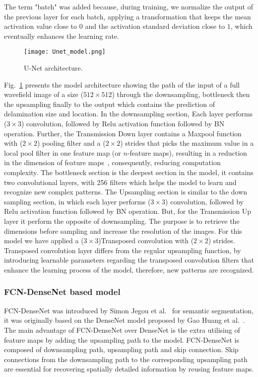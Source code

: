 \documentclass[preprint,9pt]{elsarticle}
\begin{document}
The term "batch" was added because, during training, we normalize the output of the previous layer for each batch, applying a transformation that keeps the mean activation value close to \(0\) and the activation standard deviation close to \(1\), which eventually enhances the learning rate.
\begin{figure} [h!]
	\begin{center}
		\texttt{[image: Unet\_model.png]}
	\end{center}
	\caption{U-Net architecture.} 
	\label{fig:Unet}
\end{figure}
Fig.~\ref{fig:Unet} presents the model architecture showing the path of the input of a full wavefield image of a size (\(512\times512\)) through the downsampling, bottleneck then the upsampling finally to the output which contains the prediction of delamination size and location. 
In the downsampling section,
Each layer performs (\(3\times3\)) convolution, followed by Relu activation function followed by BN operation.
Further, the Transmission Down layer contains a Maxpool function with (\(2\times2\)) pooling filter and a (\(2\times2\)) strides that picks the maximum value in a local pool filter in one feature map (or \(n\)-feature maps), resulting in a reduction in the dimension of feature maps~\cite{Lecun2015}, consequently, reducing computation complexity.
The bottleneck section is the deepest section in the model, it contains two convolutional layers, with 256 filters which helps the model to learn and recognize new complex patterns.
The Upsampling section is similar to the down sampling section, in which each layer  performs (\(3\times3\)) convolution, followed by Relu activation function followed by BN operation. But, for the Transmission Up layer it perform the opposite of downsampling.
The purpose is to retrieve the dimensions before sampling and increase the resolution of the images. 
For this model we have applied a (\(3\times3\))Transposed convolution with (\(2\times2\)) strides.
Transposed convolution layer differs from the regular upsampling function, by introducing learnable parameters regarding the transposed convolution filters that enhance the learning process of the model, therefore, new patterns are recognized. 


\subsubsection{FCN-DenseNet based model}
FCN-DenseNet was introduced by Simon Jegou et al.~\cite{Jegou} for semantic segmentation, it was originally based on the DenseNet model proposed by Gao Huang et al.~\cite{Huang}. 
The main advantage of FCN-DenseNet over DenseNet is the extra utilising of feature maps by adding the upsampling path to the model.
FCN-DenseNet is composed of downsampling path, upsampling path and skip connection.
Skip connections from the downsampling path to the corresponding upsampling path are essential for recovering spatially detailed information by reusing feature maps.
 
\end{document}
